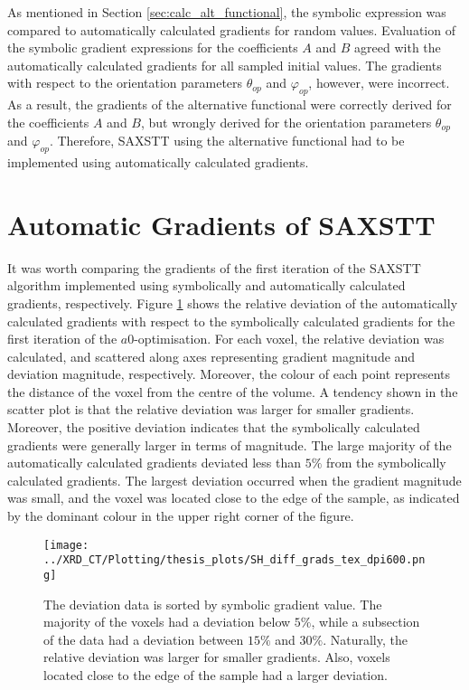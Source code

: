 
As mentioned in Section \ref{sec:calc_alt_functional}, the symbolic expression was compared to automatically calculated gradients for random values.
Evaluation of the symbolic gradient expressions for the coefficients $A$ and $B$ agreed with the automatically calculated gradients for all sampled initial values.
The gradients with respect to the orientation parameters $\theta_{op}$ and $\varphi_{op}$, however, were incorrect.
As a result, the gradients of the alternative functional were correctly derived for the coefficients $A$ and $B$,
but wrongly derived for the orientation parameters $\theta_{op}$ and $\varphi_{op}$.
Therefore, SAXSTT using the alternative functional had to be implemented using automatically calculated gradients.

\section{Automatic Gradients of SAXSTT}

It was worth comparing the gradients of the first iteration of the SAXSTT algorithm implemented using symbolically and automatically calculated gradients, respectively.
Figure \ref{fig:gradient_comparison} shows
the relative deviation of the automatically calculated gradients with respect to the symbolically calculated gradients for the first iteration of the $a0$-optimisation.
For each voxel, the relative deviation was calculated, and scattered along axes representing gradient magnitude and deviation magnitude, respectively.
Moreover, the colour of each point represents the distance of the voxel from the centre of the volume.
A tendency shown in the scatter plot is that the relative deviation was larger for smaller gradients.
Moreover, the positive deviation indicates that the symbolically calculated gradients were generally larger in terms of magnitude.
The large majority of the automatically calculated gradients deviated less than $5\%$ from the symbolically calculated gradients.
The largest deviation occurred when the gradient magnitude was small, and the voxel was located close to the edge of the sample,
as indicated by the dominant colour in the upper right corner of the figure.

\begin{figure}[h!]
    \centering
    \texttt{[image: ../XRD\_CT/Plotting/thesis\_plots/SH\_diff\_grads\_tex\_dpi600.png]}
    \caption{The deviation data is sorted by symbolic gradient value.
        The majority of the voxels had a deviation below $5\%$, while a subsection of the data had a deviation between $15\%$ and $30\%$.
        Naturally, the relative deviation was larger for smaller gradients.
        Also, voxels located close to the edge of the sample had a larger deviation.}
    \label{fig:gradient_comparison}
\end{figure} %



